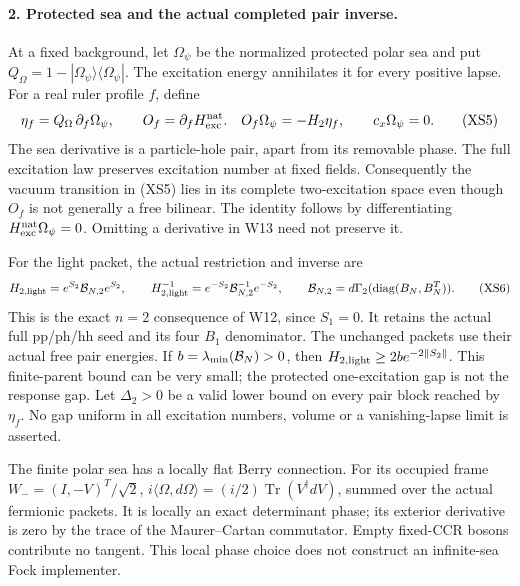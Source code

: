 \documentclass[11pt]{article}
\DeclareMathOperator{\Tr}{Tr}
\begin{document}
\paragraph{2. Protected sea and the actual completed pair inverse.}
At a fixed background, let $\Omega_\psi$ be the normalized
protected polar sea and put
$Q_\Omega=1-|\Omega_\psi\rangle\langle\Omega_\psi|$.
The excitation energy annihilates it for every positive lapse.
For a real ruler profile $f$, define
\begin{equation}
 \eta_f=Q_\Omega\,\partial_f\Omega_\psi,\qquad
 O_f=\partial_f H_{\rm exc}^{\rm nat}.
 \quad
 O_f\Omega_\psi=-H_2\eta_f,\qquad
 c_x\Omega_\psi=0.
 \tag{XS5}
\end{equation}
The sea derivative is a particle-hole pair, apart from its
removable phase.  The full excitation law preserves excitation
number at fixed fields.  Consequently the vacuum transition
in (XS5) lies in its complete two-excitation space even though
$O_f$ is not generally a free bilinear.  The identity follows
by differentiating $H_{\rm exc}^{\rm nat}\Omega_\psi=0$.
Omitting a derivative in W13 need not preserve it.

For the light packet, the actual restriction and inverse are
\begin{equation}
 H_{2,\rm light}
  =e^{S_2}{\cal B}_{N,2}e^{S_2},\qquad
 H_{2,\rm light}^{-1}
  =e^{-S_2}{\cal B}_{N,2}^{-1}e^{-S_2},\qquad
 {\cal B}_{N,2}=d\Gamma_2(\operatorname{diag}(B_N,B_N^T)).
 \tag{XS6}
\end{equation}
This is the exact $n=2$ consequence of W12, since $S_1=0$.
It retains the actual full pp/ph/hh seed and its four
$B_1$ denominator.  The unchanged packets use their actual
free pair energies.  If $b=\lambda_{\min}({\cal B}_N)>0$,
then $H_{2,\rm light}\geq2b e^{-2\|S_2\|}$.
This finite-parent bound can be very small; the protected
one-excitation gap is not the response gap.
Let $\Delta_2>0$ be a valid lower bound on every pair block
reached by $\eta_f$.  No gap uniform in all excitation numbers,
volume or a vanishing-lapse limit is asserted.

The finite polar sea has a locally flat Berry connection.
For its occupied frame $W_-=(I,-V)^T/\sqrt2$,
$i\langle\Omega,d\Omega\rangle=(i/2)\Tr(V^\dagger dV)$,
summed over the actual fermionic packets.  It is locally
an exact determinant phase; its exterior derivative is zero
by the trace of the Maurer--Cartan commutator.  Empty fixed-CCR
bosons contribute no tangent.  This local phase choice does
not construct an infinite-sea Fock implementer.
\end{document}
